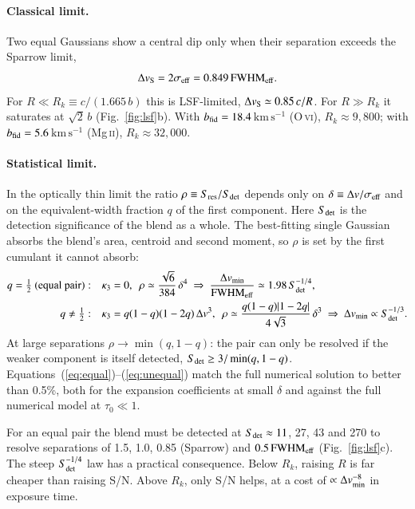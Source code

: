 \documentclass[10pt]{article}
\newcommand{\kms}{\ensuremath{\mathrm{km\,s^{-1}}}}
\newcommand{\OVI}{O\,\textsc{vi}}
\newcommand{\MgII}{Mg\,\textsc{ii}}
\newcommand{\fwhm}{\ensuremath{\mathrm{FWHM}}}
\newcommand{\Sdet}{\ensuremath{S_{\rm det}}}
\newcommand{\Sres}{\ensuremath{S_{\rm res}}}
\begin{document}
\paragraph{Classical limit.} Two equal Gaussians show a central dip only when their separation exceeds the Sparrow limit,
\begin{equation}
\Delta v_{\rm S}=2\sigma_{\rm eff}=0.849\,\fwhm_{\rm eff}.
\end{equation}
For $R\ll R_k\equiv c/(1.665\,b)$ this is LSF-limited, $\Delta v_{\rm S}\simeq0.85\,c/R$. For $R\gg R_k$ it saturates at $\sqrt2\,b$ (Fig.~\ref{fig:lsf}b). With $b_{\rm fid}=18.4$\,\kms{} (\OVI), $R_k\approx9{,}800$; with $b_{\rm fid}=5.6$\,\kms{} (\MgII), $R_k\approx32{,}000$.

\paragraph{Statistical limit.} In the optically thin limit the ratio $\rho\equiv\Sres/\Sdet$ depends only on $\delta\equiv\Delta v/\sigma_{\rm eff}$ and on the equivalent-width fraction $q$ of the first component. Here $\Sdet$ is the detection significance of the blend as a whole. The best-fitting single Gaussian absorbs the blend's area, centroid and second moment, so $\rho$ is set by the first cumulant it cannot absorb:
\begin{align}
q=\tfrac12\ (\text{equal pair}):&\quad \kappa_3=0,\ \ \rho\simeq\frac{\sqrt6}{384}\,\delta^4
\ \Rightarrow\ \frac{\Delta v_{\rm min}}{\fwhm_{\rm eff}}\simeq1.98\,\Sdet^{-1/4},\label{eq:equal}\\
q\neq\tfrac12:&\quad \kappa_3=q(1-q)(1-2q)\,\Delta v^3,\ \ \rho\simeq\frac{q(1-q)|1-2q|}{4\sqrt3}\,\delta^3
\ \Rightarrow\ \Delta v_{\rm min}\propto\Sdet^{-1/3}.\label{eq:unequal}
\end{align}
At large separations $\rho\to\min(q,1-q)$: the pair can only be resolved if the weaker component is itself detected, $\Sdet\ge3/\min(q,1-q)$. Equations~(\ref{eq:equal})--(\ref{eq:unequal}) match the full numerical solution to better than 0.5\%, both for the expansion coefficients at small $\delta$ and against the full numerical model at $\tau_0\ll1$.

For an equal pair the blend must be detected at $\Sdet\approx11$, 27, 43 and 270 to resolve separations of 1.5, 1.0, 0.85 (Sparrow) and $0.5\,\fwhm_{\rm eff}$ (Fig.~\ref{fig:lsf}c). The steep $\Sdet^{-1/4}$ law has a practical consequence. Below $R_k$, raising $R$ is far cheaper than raising S/N. Above $R_k$, only S/N helps, at a cost of $\propto\Delta v_{\rm min}^{-8}$ in exposure time.
\end{document}
